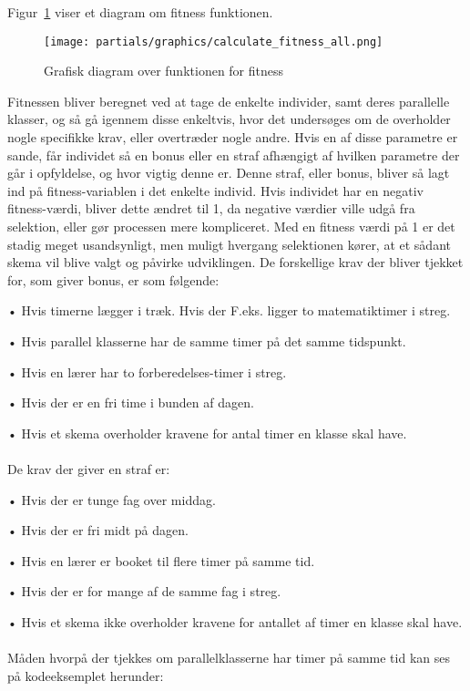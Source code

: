 Figur~\ref{fig:diagramfitness} viser et diagram om fitness funktionen.
\begin{figure}[!h]
\texttt{[image: partials/graphics/calculate\_fitness\_all.png]}
\caption{Grafisk diagram over funktionen for fitness}
\label{fig:diagramfitness}
\end{figure}

Fitnessen bliver beregnet ved at tage de enkelte individer, samt deres parallelle klasser, og så gå igennem disse enkeltvis, hvor det undersøges om de overholder nogle specifikke krav, eller overtræder nogle andre. Hvis en af disse parametre er sande, får individet så en bonus eller en straf afhængigt af hvilken parametre der går i opfyldelse, og hvor vigtig denne er. Denne straf, eller bonus, bliver så lagt ind på fitness-variablen i det enkelte individ. Hvis individet har en negativ fitness-værdi, bliver dette ændret til 1, da negative værdier ville udgå fra selektion, eller gør processen mere kompliceret. Med en fitness værdi på 1 er det stadig meget usandsynligt, men muligt hvergang selektionen kører, at et sådant skema vil blive valgt og påvirke udviklingen.
De forskellige krav der bliver tjekket for, som giver bonus, er som følgende:

•	Hvis timerne lægger i træk. Hvis der F.eks. ligger to matematiktimer i streg.
   
•	Hvis parallel klasserne har de samme timer på det samme tidspunkt. 
   
•	Hvis en lærer har to forberedelses-timer i streg.
   
•	Hvis der er en fri time i bunden af dagen.
   
•	Hvis et skema overholder kravene for antal timer en klasse skal have.
\\\\   
De krav der giver en straf er:

•	Hvis der er tunge fag over middag.
   
•	Hvis der er fri midt på dagen.
   
•	Hvis en lærer er booket til flere timer på samme tid.
   
•	Hvis der er for mange af de samme fag i streg.
   
•	Hvis et skema ikke overholder kravene for antallet af timer en klasse skal have.
\\\\
Måden hvorpå der tjekkes om parallelklasserne har timer på samme tid kan ses på kodeeksemplet herunder:


